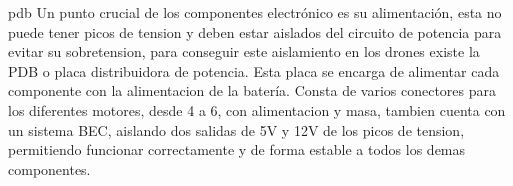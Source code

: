 
pdb
Un punto crucial de los componentes electrónico es su alimentación, esta no puede tener picos de tension y deben estar aislados del circuito de potencia para evitar su sobretension, para conseguir este aislamiento en los drones existe la PDB o placa distribuidora de potencia.
                Esta placa se encarga de alimentar cada componente con la alimentacion de la batería. Consta de varios conectores para los diferentes motores, desde 4 a 6, con alimentacion y masa, tambien cuenta con un sistema BEC, aislando dos salidas de 5V y 12V de los picos de tension, permitiendo funcionar correctamente y de forma estable a todos los demas componentes.